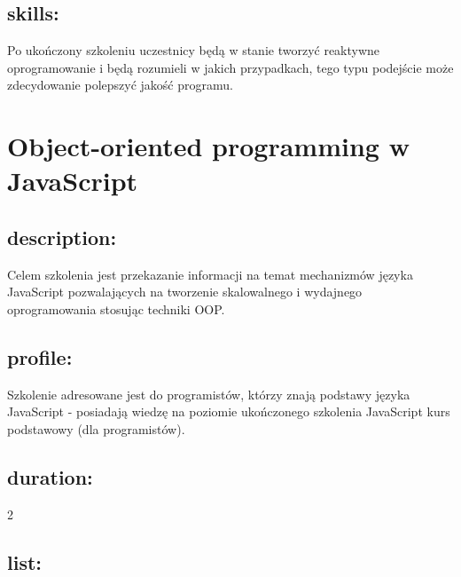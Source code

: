 \documentclass{article}[10pt]
\begin{document}
	\subsection*{skills:}
\begin{adjustwidth}{2cm}{}
	
Po ukończony szkoleniu uczestnicy będą w stanie tworzyć reaktywne oprogramowanie i będą rozumieli w jakich przypadkach, tego typu podejście może zdecydowanie polepszyć jakość programu.
\end{adjustwidth}

\newpage


    
	\section{Object-oriented programming
w JavaScript}

	\subsection*{description:}
	\begin{adjustwidth}{2cm}{}
		
Celem szkolenia jest przekazanie informacji na temat mechanizmów języka JavaScript pozwalających na tworzenie skalowalnego i wydajnego oprogramowania stosując techniki OOP.
	\end{adjustwidth}
	\subsection*{profile:}
\begin{adjustwidth}{2cm}{}
	
Szkolenie adresowane jest do programistów, którzy znają podstawy języka JavaScript  - posiadają wiedzę na poziomie ukończonego szkolenia JavaScript kurs podstawowy (dla programistów).
\end{adjustwidth}
	\subsection*{duration:}
\begin{adjustwidth}{2cm}{}
	2
\end{adjustwidth}

	\subsection*{list:}
\begin{adjustwidth}{1.5cm}{}
	\begin{itemize}


























	\end{itemize}
\end{adjustwidth}
\end{document}
